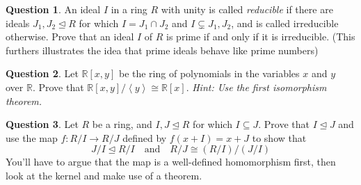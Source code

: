 \documentclass[11pt]{article}
\def\mbb{\mathbb}
\def\R{\mbb{R}}
\def\and{\quad \text{and} \quad}
\newcommand{\Ang}[1]{\left\langle #1 \right\rangle}
\theoremstyle{pink}
\theoremstyle{boxedsolution}
\theoremstyle{definition}
\newtheorem{question}{Question}
\theoremstyle{claim}
\begin{document}
\begin{question}
An ideal $I$ in a ring $R$ with unity is called \textit{reducible} if there are ideals $J_1, J_2 \trianglelefteq R$ for which $I = J_1 \cap J_2$ and $I \subsetneq J_1, J_2$, and is called irreducible otherwise. Prove that an ideal $I$ of $R$ is prime if and only if it is irreducible. (This furthers illustrates the idea that prime ideals behave like prime numbers)
\end{question}

\begin{question}
Let $\R[x,y]$ be the ring of polynomials in the variables $x$ and $y$ over $\R$. Prove that $\R[x,y]/\Ang{y} \cong \R[x]$. \textit{Hint: Use the first isomorphism theorem.}
\end{question}

\begin{question}
Let $R$ be a ring, and $I,J \trianglelefteq R$ for which $I \subseteq J$. Prove that $I \trianglelefteq J$ and use the map $f: R/I \to R/J$ defined by $f(x + I) = x + J$ to show that
\[
J/I \trianglelefteq R/I \and R/J \cong (R/I)/(J / I)
\]
You'll have to argue that the map is a well-defined homomorphism first, then look at the kernel and make use of a theorem.
\end{question}
\end{document}
